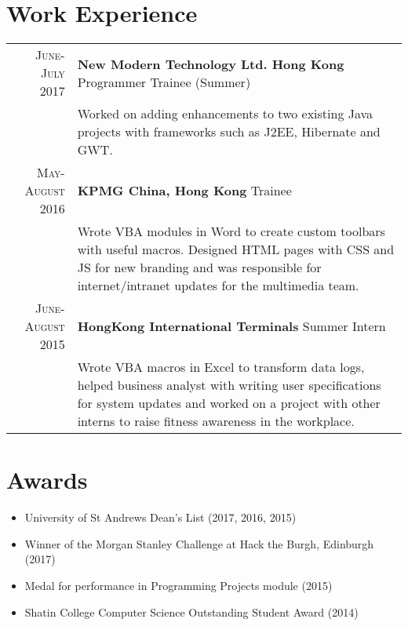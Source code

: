\documentclass{article}
\newcommand{\n}[0]{\\[\baselineskip]}
\begin{document}
\section*{Work Experience}
\begin{tabular}{r|p{15cm}}

\textsc{June-July 2017} & \textbf{New Modern Technology Ltd. Hong Kong} Programmer Trainee (Summer) \\

&\footnotesize{Worked on adding enhancements to two existing Java projects with frameworks such as J2EE, Hibernate and GWT.}\n


\textsc{May-August 2016} & \textbf{KPMG China, Hong Kong} Trainee \\
 
&\footnotesize{Wrote VBA modules in Word to create custom toolbars with useful macros. Designed HTML pages with CSS and JS for new branding and was responsible for internet/intranet updates for the multimedia team.}\n

\textsc{June-August 2015} & \textbf{HongKong International Terminals} Summer Intern\\

&\footnotesize{Wrote VBA macros in Excel to transform data logs, helped business analyst with writing user specifications for system updates and worked on a project with other interns to raise fitness awareness in the workplace.}\\

\end{tabular}

\section*{Awards}
\setlength\multicolsep{0pt}
\begin{multicols}{2}
\begin{itemize}
\item University of St Andrews Dean's List (2017, 2016, 2015)
\item Winner of the Morgan Stanley Challenge at Hack the Burgh, Edinburgh (2017)
\end{itemize}
\columnbreak
\begin{itemize}
\item Medal for performance in Programming Projects module (2015)
\item Shatin College Computer Science Outstanding Student Award (2014)
\end{itemize}
\end{multicols}
\end{document}
